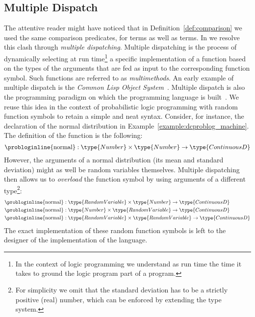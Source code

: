 \subsection{Multiple Dispatch} \label{ref:multiple_dispatch}
The attentive reader might have noticed that in Definition~\ref{def:comparison} we used the same comparison predicates, for  terms as well as  terms. In \dcproblogsty we resolve this clash through {\em multiple dispatching}\citep{castagna1995calculus}.
{ Multiple dispatching} is the process of dynamically selecting at run time\footnote{In the context of logic programming we understand as run time the time it takes to ground the logic program part of a \dcproblogsty program.} a specific implementation of a function based on the types of the arguments that are fed as input to the corresponding function symbol.
Such functions are referred to as {\em multimethods}. 
An early example of multiple dispatch is the {\em Common Lisp Object System}~\citep{keene1989object}. Multiple dispatch is also the programming paradigm on which the \juliasty programming language is built~\citep{bezanson2017julia}. We reuse this idea in the context of probabilistic logic programming with random function symbols to retain a simple and neat syntax.
Consider, for instance, the declaration of the normal distribution in Example~\ref{example:dcproblog_machine}.
The definition of the function is the following:
$$ \text{\probloginline{normal}}: \type{Number} \times \type{Number} \rightarrow \type{ContinuousD}$$
However, the arguments of a normal distribution (its mean and standard deviation) might as well be random variables themselves.
Multiple dispatching then allows us to {\em overload} the  function symbol by using arguments of a different type\footnote{For simplicity we omit that the standard deviation has to be a strictly positive (real) number, which can be enforced by extending the type system.}:
\begin{align*}
	\text{\probloginline{normal}}&: \type{RandomVariable} \times \type{Number} \rightarrow \type{ContinuousD} \\
	\text{\probloginline{normal}}&: \type{Number} \times \type{RandomVariable} \rightarrow \type{ContinuousD} \\
	\text{\probloginline{normal}}&: \type{RandomVariable} \times \type{RandomVariable} \rightarrow \type{ContinuousD}
\end{align*}
The exact implementation of these random function symbols is left to the designer of the implementation of the language.




